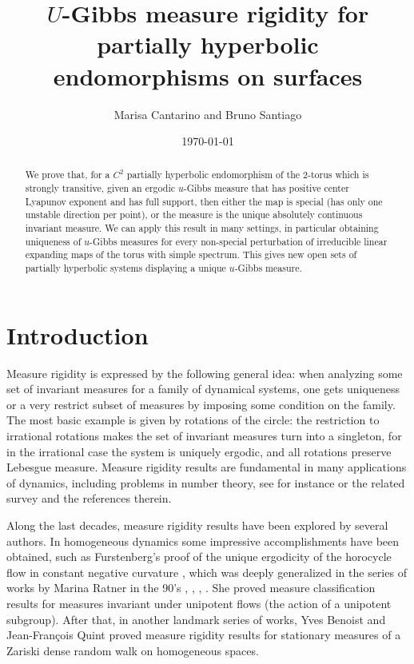 \documentclass[a4paper,11pt,reqno]{amsart}
\date{}
\theoremstyle{definition}
\begin{document}
\title[$\mathbf{\textit{U}}$-Gibbs rigidity for PH endomorphisms on surfaces]{$\mathbf{\textit{U}}$-Gibbs measure rigidity for partially hyperbolic endomorphisms on surfaces}


\author[Marisa Cantarino and Bruno Santiago]{Marisa Cantarino and Bruno Santiago}
\address{}
\email{}


\date{\today}

\begin{abstract} 
We prove that, for a $C^2$ partially hyperbolic endomorphism of the 2-torus which is strongly transitive, given an ergodic $u$-Gibbs measure that has positive center Lyapunov exponent and has full support, then either the map is special (has only one unstable direction per point), or the measure is the unique absolutely continuous invariant measure. We can apply this result in many settings, in particular obtaining uniqueness of $u$-Gibbs measures for every non-special perturbation of irreducible linear expanding maps of the torus with simple spectrum. This gives new open sets of partially hyperbolic systems displaying a unique $u$-Gibbs measure.
\end{abstract}

\maketitle

\tableofcontents

\section{Introduction}
\label{sec:intro}

Measure rigidity is expressed by the following general idea: when analyzing some set of invariant measures for a family of dynamical systems, one gets uniqueness or a very restrict subset of measures by imposing some condition on the family. The most basic example is given by rotations of the circle: the restriction to irrational rotations makes the set of invariant measures turn into a singleton, for in the irrational case the system is uniquely ergodic, and all rotations preserve Lebesgue measure. Measure rigidity results are fundamental in many applications of dynamics, including problems in number theory, see for instance \cite{EKL} or the related survey \cite{venkatesh} and the references therein.

Along the last decades, measure rigidity results have been explored by several authors. In homogeneous dynamics some impressive accomplishments have been obtained, such as Furstenberg's proof of the unique ergodicity of the horocycle flow in constant negative curvature \cite{Furst}, which was deeply generalized in the series of works by Marina Ratner in the 90's \cite{Rat1}, \cite{Rat2}, \cite{Rat3}, \cite{Rat4}. She proved measure classification results for measures invariant under unipotent flows (the action of a unipotent subgroup). After that, in another landmark series of works, Yves Benoist and Jean-François Quint proved \cite{BenoistQuintI,BenoistQuintII,BenoistQuintIII} measure rigidity results for stationary measures of a Zariski dense random walk on homogeneous spaces.
\end{document}
